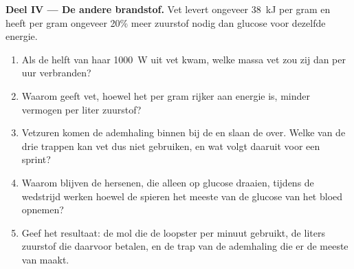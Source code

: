 \begin{problem}
\medskip
\noindent\textbf{Deel IV --- De andere brandstof.}
Vet levert ongeveer \qty{38}{kJ} per gram en heeft per gram ongeveer 20\%
meer zuurstof nodig dan glucose voor dezelfde energie.
\begin{enumerate}[resume]
  \item Als de helft van haar \qty{1000}{W} uit vet kwam, welke massa vet
        zou zij dan per uur verbranden?
  \item Waarom geeft vet, hoewel het per gram rijker aan energie is,
        minder vermogen per liter zuurstof?
  \item Vetzuren komen de ademhaling binnen bij de  en slaan de
         over. Welke van de drie trappen kan vet dus niet
        gebruiken, en wat volgt daaruit voor een sprint?
  \item Waarom blijven de hersenen, die alleen op glucose draaien, tijdens
        de wedstrijd werken hoewel de spieren het meeste van de glucose
        van het bloed opnemen?
  \item Geef het resultaat: de mol  die de loopster per minuut
        gebruikt, de liters zuurstof die daarvoor betalen, en de trap van
        de ademhaling die er de meeste van maakt.
\end{enumerate}
\end{problem}
